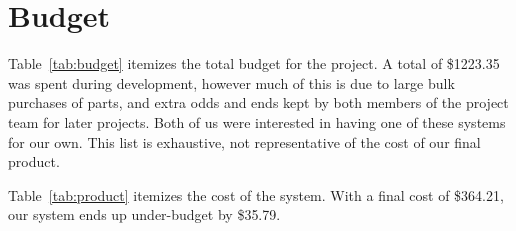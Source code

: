 \chapter{Budget}


Table~\ref{tab:budget} itemizes the total budget for the project. A total of
\$1223.35 was spent during development, however much of this is due to
large bulk purchases of parts, and extra odds and ends kept by both members of
the project team for later projects. Both of us were interested in having one
of these systems for our own. This list is exhaustive, not representative of
the cost of our final product.

Table~\ref{tab:product} itemizes the cost of the system. With a final cost
of \$364.21, our system ends up under-budget by \$35.79.

